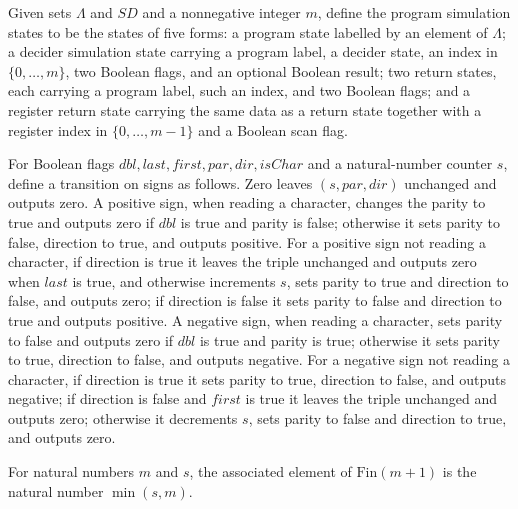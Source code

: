 \begin{definition}
\label{Complexity.LogProg.CSt}
\leanok
Given sets $\Lambda$ and $SD$ and a nonnegative integer $m$, define the program
simulation states to be the states of five forms: a program state labelled by an element
of $\Lambda$; a decider simulation state carrying a program label, a decider state, an
index in $\{0,\ldots,m\}$, two Boolean flags, and an optional Boolean result; two return
states, each carrying a program label, such an index, and two Boolean flags; and a
register return state carrying the same data as a return state together with a register
index in $\{0,\ldots,m-1\}$ and a Boolean scan flag.
\end{definition}

\begin{definition}
\label{Complexity.LogProg.gstep}
\leanok
For Boolean flags
$\mathit{dbl},\mathit{last},\mathit{first},\mathit{par},\mathit{dir},\mathit{isChar}$
and a natural-number counter $s$, define a transition on signs as follows. Zero leaves
$(s,\mathit{par},\mathit{dir})$ unchanged and outputs zero. A positive sign, when
reading a character, changes the parity to true and outputs zero if $\mathit{dbl}$ is
true and parity is false; otherwise it sets parity to false, direction to true, and
outputs positive. For a positive sign not reading a character, if direction is true it
leaves the triple unchanged and outputs zero when $\mathit{last}$ is true, and otherwise
increments $s$, sets parity to true and direction to false, and outputs zero; if
direction is false it sets parity to false and direction to true and outputs positive. A
negative sign, when reading a character, sets parity to false and outputs zero if
$\mathit{dbl}$ is true and parity is true; otherwise it sets parity to true, direction
to false, and outputs negative. For a negative sign not reading a character, if
direction is true it sets parity to true, direction to false, and outputs negative; if
direction is false and $\mathit{first}$ is true it leaves the triple unchanged and
outputs zero; otherwise it decrements $s$, sets parity to false and direction to true,
and outputs zero.
\end{definition}

\begin{definition}
\label{Complexity.LogProg.toFin}
\leanok
For natural numbers $m$ and $s$, the associated element of $\mathrm{Fin}(m+1)$ is the
natural number $\min(s,m)$.
\end{definition}

